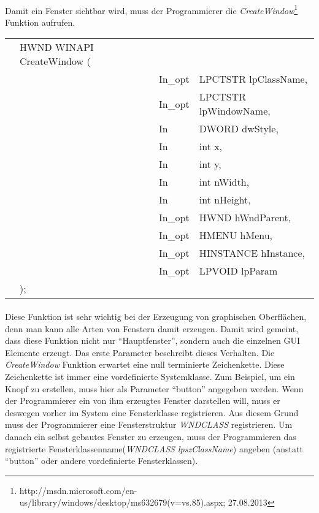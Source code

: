 \paragraph{}
Damit ein Fenster sichtbar wird, muss der Programmierer die \textit{CreateWindow}\footnote{http://msdn.microsoft.com/en-us/library/windows/desktop/ms632679(v=vs.85).aspx; 27.08.2013} Funktion aufrufen. 


\begin{tabular}{llll}
&HWND WINAPI CreateWindow (&\\
& & In\_opt & LPCTSTR lpClassName,\\
& & In\_opt & LPCTSTR lpWindowName,\\
& & In      & DWORD dwStyle,\\
& & In      & int x,\\
& & In      & int y,\\
& & In      & int nWidth,\\
& & In      & int nHeight,\\
& & In\_opt & HWND hWndParent,\\
& & In\_opt & HMENU hMenu,\\
& & In\_opt & HINSTANCE hInstance,\\
& & In\_opt & LPVOID lpParam\\
&);
\end{tabular}


\paragraph{}
Diese Funktion ist sehr wichtig bei der Erzeugung von graphischen Oberflächen, denn man kann alle Arten von Fenstern damit erzeugen. Damit wird gemeint, dass diese Funktion  nicht nur "`Hauptfenster"', sondern auch die einzelnen GUI Elemente erzeugt. Das erste Parameter beschreibt dieses Verhalten. Die \textit{CreateWindow} Funktion erwartet eine null terminierte Zeichenkette. Diese Zeichenkette ist immer eine vordefinierte Systemklasse. Zum Beispiel, um ein Knopf zu erstellen, muss hier als Parameter "`button"' angegeben werden. Wenn der Programmierer ein von ihm erzeugtes Fenster darstellen will, muss er deswegen vorher im System eine Fensterklasse registrieren. Aus diesem Grund muss der Programmierer eine Fensterstruktur \textit{WNDCLASS} registrieren. Um danach ein selbst gebautes Fenster zu erzeugen, muss der Programmieren das registrierte Fensterklassenname(\textit{WNDCLASS lpszClassName}) angeben (anstatt "`button"' oder andere vordefinierte Fensterklassen).

